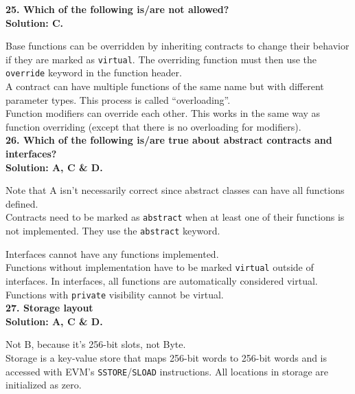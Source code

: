 \textbf{25. Which of the following is/are not allowed?}\label{sec:exam3_q25}\\

\textbf{Solution: C.}

Base functions can be overridden by inheriting contracts to change their behavior if they are marked as \verb|virtual|.
The overriding function must then use the \verb|override| keyword in the function header.\\

A contract can have multiple functions of the same name but with different parameter types.
This process is called ``overloading''.\\

Function modifiers can override each other.
This works in the same way as function overriding (except that there is no overloading for modifiers).\\

\textbf{26. Which of the following is/are true about abstract contracts and interfaces?}\label{sec:exam3_q26}\\

\textbf{Solution: A, C \& D.}

Note that A isn't necessarily correct since abstract classes can have all functions defined.\\

Contracts need to be marked as \verb|abstract| when at least one of their functions is not implemented.
They use the \verb|abstract| keyword.

Interfaces cannot have any functions implemented.\\

Functions without implementation have to be marked \verb|virtual| outside of interfaces.
In interfaces, all functions are automatically considered virtual.
Functions with \verb|private| visibility cannot be virtual.\\


\textbf{27. Storage layout}\label{sec:exam3_q27}\\

\textbf{Solution: A, C \& D.}

Not B, because it's 256-bit slots, not Byte.\\

Storage is a key-value store that maps 256-bit words to 256-bit words and is accessed with EVM's \verb|SSTORE|/\verb|SLOAD| instructions.
All locations in storage are initialized as zero.\\


